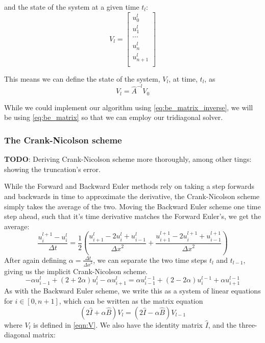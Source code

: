 \documentclass[10pt,a4paper]{article}
\newcommand{\dt}{{\Delta t}}
\newcommand{\dx}{{\Delta x}}
\begin{document}
and the state of the system at a given time $t_l$:
\begin{equation}\label{eqn:V} V_l = \begin{bmatrix}
u_{0}^l\\
u_{1}^l\\
\cdots\\
u_{n}^l\\
u_{n+1}^l\\
\end{bmatrix}
\end{equation}

This means we can define the state of the system, $V_l$, at time, $t_l$, as
\begin{equation} \label{eq:be_matrix_inverse}
V_l = \hat{A}^{-l}V_0
\end{equation}

While we could implement our algorithm using \ref{eq:be_matrix_inverse}, we will be using \ref{eq:be_matrix} so that we can employ our tridiagonal solver.

\subsubsection{The Crank-Nicolson scheme}
\textbf{TODO}: Deriving Crank-Nicolson scheme more thoroughly, among other tings: showing the truncation's error.

While the Forward and Backward Euler methods rely on taking a step forwards and backwards in time to approximate the derivative, the Crank-Nicolson scheme simply takes the average of the two. Moving the Backward Euler scheme one time step ahead, such that it's time derivative matches the Forward Euler's, we get the average:
\begin{equation}
\frac{u_i^{l+1}-u_i^l}{\dt} = \frac{1}{2}\left( \frac{u_{i+1}^l - 2u_i^l + u_{i-1}^l}{\dx^2} + \frac{u_{i+1}^{l+1} - 2u_i^{l+1} + u_{i-1}^{l+1}}{\dx^2}\right)
\end{equation}
After again defining $\alpha = \frac{\dt}{\dx^2}$, we can separate the two time steps $t_l$ and $t_{l-1}$, giving us the implicit Crank-Nicolson scheme.
\begin{equation}
-\alpha u_{i-1}^l + (2+2\alpha)u_i^l - \alpha u_{i+1}^l = \alpha u_{i-1}^{l-1} + (2-2\alpha)u_i^{l-1} + \alpha u_{i+1}^{l-1}
\end{equation}
As with the Backward Euler scheme, we write this as a system of linear equations for $i \in [0,n+1]$, which can be written as the matrix equation
\begin{equation}\label{eqn:crank}
(2\hat{I}+\alpha \hat{B})V_l = (2\hat{I}-\alpha \hat{B})V_{l-1}
\end{equation}
where $V_l$ is defined in \vref{eqn:V}. We also have the identity matrix $\hat{I}$, and the three-diagonal matrix:
\end{document}
